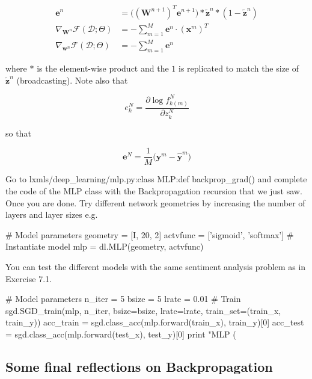 \begin{align}
\mathbf{e}^{n} & = \Big((\mathbf{W}^{n+1})^T \mathbf{e}^{n+1}\Big) \ast \tilde{\mathbf{z}}^n \ast (1-\tilde{\mathbf{z}}^n)\\
\nabla_{\mathbf{W}^n}\mathcal{F}(\mathcal{D};\Theta) & = -\sum_{m=1}^M \mathbf{e}^{n} \cdot \left(\mathbf{x}^m\right)^T \\ 
\nabla_{\mathbf{w}^n}\mathcal{F}(\mathcal{D};\Theta) & = -\sum_{m=1}^M \mathbf{e}^{n}  
\end{align}

\noindent where $\ast$ is the element-wise product and the $1$ is replicated to match the size of $\tilde{\mathbf{z}}^n$ (broadcasting). Note also that 

\begin{equation}
e^N_k = \frac{\partial \log f_{k(m)}^N}{\partial z^{N}_{k}}  
\label{eq:finalError}
\end{equation}

\noindent so that

\begin{equation}
\mathbf{e}^N =\frac{1}{M}\Big(\mathbf{y}^m - \hat{\mathbf{y}}^m \Big)  
\end{equation}

\begin{exercise}
Go to lxmls/deep\_learning/mlp.py:class MLP:def backprop\_grad() and complete the code of the MLP class with the Backpropagation recursion that we just saw. Once you are done. Try different network geometries by increasing the number of layers and layer sizes e.g.
\begin{python}
# Model parameters
geometry = [I, 20, 2]
actvfunc = ['sigmoid', 'softmax'] 
# Instantiate model
mlp      = dl.MLP(geometry, actvfunc) 
\end{python}
You can test the different models with the same sentiment analysis problem as in Exercise 7.1. 
\begin{python}
# Model parameters
n_iter = 5
bsize  = 5
lrate  = 0.01
# Train
sgd.SGD_train(mlp, n_iter, bsize=bsize, lrate=lrate, train_set=(train_x, train_y))
acc_train = sgd.class_acc(mlp.forward(train_x), train_y)[0]
acc_test  = sgd.class_acc(mlp.forward(test_x), test_y)[0]
print "MLP (%
\end{python}
\end{exercise}

\subsection{Some final reflections on Backpropagation}

